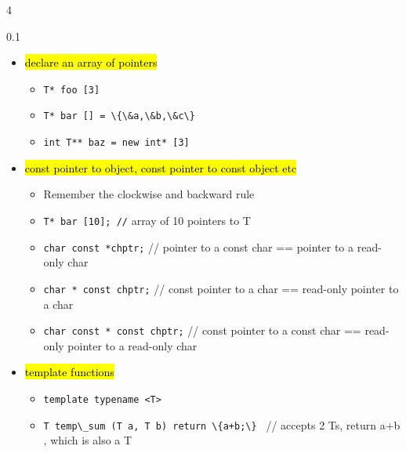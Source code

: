 \documentclass[10pt,landscape,a4paper]{article}
\newcommand{\cicode}[1]{\colorbox{highlightgray}{\lstinline[basicstyle=\ttfamily\color{black}]|#1|} }
\begin{document}
\begin{multicols*}{4}
\begin{spacing}{0.1}
\begin{itemize}
\item \hl{declare an array of pointers}
\begin{itemize}
	\item \cicode{T* foo [3]}
	\item \cicode{T* bar [] = \{\&a,\&b,\&c\} }
	\item \cicode{int T** baz = new int* [3]}
\end{itemize}

\item \hl{const pointer to object, const pointer to const object etc}
\begin{itemize}
	\item Remember the clockwise and backward rule
	\item \cicode{T* bar [10]; //} array of 10 pointers to T
	\item \cicode{char const *chptr;} // pointer to a const char == pointer to a read-only char
	\item \cicode{char * const chptr;} // const pointer to a char == read-only pointer to a char
	\item \cicode{char const * const chptr;} // const pointer to a const char == read-only pointer to a read-only char
\end{itemize}

\item \hl{template functions }
\begin{itemize}[label={}]
\item \cicode{template typename <T> }
\item \cicode{T temp\_sum (T a, T b) return \{a+b;\} } // accepts 2 Ts, return a+b , which is also a T
\end{itemize}

\end{itemize}

\end{spacing}
\end{multicols*}
\end{document}
